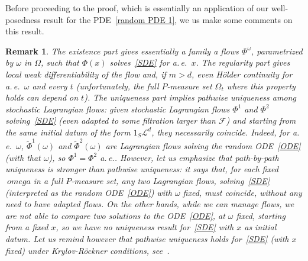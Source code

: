 \documentclass[a4paper,10pt]{article}
\newtheorem{remark}[theorem]{Remark}
\newcommand{\mc}{\mathcal}
\newcommand{\td}{\tilde}
\begin{document}
Before proceeding to the proof, which is essentially an application of our well-posedness result for the PDE~\eqref{random PDE 1}, we us make some comments on this result. 

\begin{remark}
The existence part gives essentially a family a flows $\Phi^\omega$, parametrized by $\omega$ in $\Omega$, such that $\Phi(x)$ solves~\eqref{SDE} for a.\,e.\ $x$. The regularity part gives local weak differentiability of the flow and, if $m>d$, even H\"older continuity for a.\,e.\ $\omega$ and every $t$ (unfortunately, the full $P$-measure set $\Omega_t$ where this property holds can depend on $t$). The uniqueness part implies pathwise uniqueness among stochastic Lagrangian flows: given stochastic Lagrangian flows $\Phi^1$ and $\Phi^2$ solving~\eqref{SDE} (even adapted to some filtration larger than $\mc{F}$) and starting from the same initial datum of the form $1_{S} \mc{L}^d$, they necessarily coincide. Indeed, for a.\,e.\ $\omega$, $\td{\Phi}^1(\omega)$ and $\td{\Phi}^2(\omega)$ are Lagrangian flows solving the random ODE~\eqref{ODE} (with that $\omega$), so $\Phi^1=\Phi^2$ a.\,e.. However, let us emphasize that path-by-path uniqueness is stronger than pathwise uniqueness: it says that, for each fixed $\
omega$ 
in a full $P$-measure set, any two Lagrangian flows, solving~\eqref{SDE} (interpreted as the random ODE~\eqref{ODE}) with $\omega$ fixed, must coincide, without any need to have adapted flows. On the other hands, while we can manage flows, we are not able to compare two solutions to the ODE~\eqref{ODE}, at $\omega$ fixed, starting from a fixed $x$, so we have no uniqueness result for~\eqref{SDE} with $x$ as initial datum. Let us remind however that pathwise uniqueness holds for~\eqref{SDE} (with $x$ fixed) under Krylov-R\"ockner conditions, see~\cite{KRYROE05}.
\end{remark}
\end{document}
